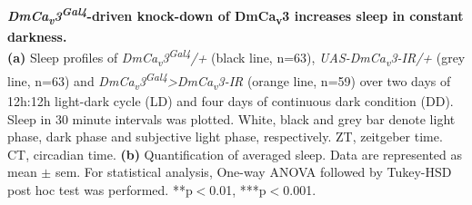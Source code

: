 \label{fig:S3}
\textbf{\emph{DmCa\textsubscript{v}3\textsuperscript{Gal4}}-driven knock-down of DmCa\textsubscript{v}3 increases sleep in constant darkness.}
\\
\textbf{(a)} Sleep profiles of \emph{DmCa\textsubscript{v}3\textsuperscript{Gal4}/+} (black line, n=63), \emph{UAS-DmCa\textsubscript{v}3-IR/+} (grey line, n=63) and \emph{DmCa\textsubscript{v}3\textsuperscript{Gal4}\textgreater{}DmCa\textsubscript{v}3-IR} (orange line, n=59) over two days of 12h:12h light-dark cycle (LD) and four days of continuous dark condition (DD).
Sleep in 30 minute intervals was plotted.
White, black and grey bar denote light phase, dark phase and subjective light phase, respectively.
ZT, zeitgeber time.
CT, circadian time.
\textbf{(b)} Quantification of averaged sleep.
Data are represented as mean $\pm$ sem.
For statistical analysis, One-way ANOVA followed by Tukey-HSD post hoc test was performed.
**p$<$0.01, ***p$<$0.001.
  
  
  
  
  
  